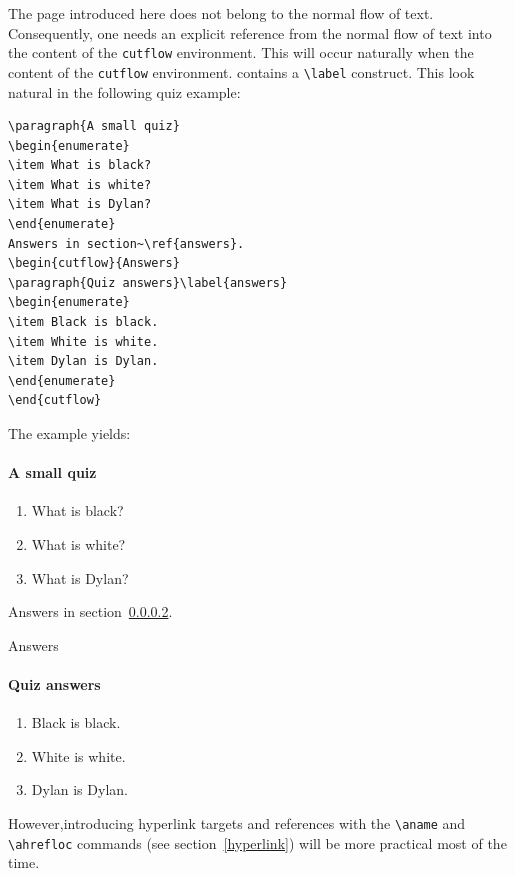 The \html{} page introduced here does not belong to the normal flow of
text.
Consequently, one needs an explicit reference from the normal flow of text
into the content of the \verb+cutflow+ environment.
This will occur naturally when the content of the \verb+cutflow+ environment.
contains a \verb+\label+ construct.
This look natural in the following quiz example:
\begin{verbatim}
\paragraph{A small quiz}
\begin{enumerate}
\item What is black?
\item What is white?
\item What is Dylan?
\end{enumerate}
Answers in section~\ref{answers}.
\begin{cutflow}{Answers}
\paragraph{Quiz answers}\label{answers}
\begin{enumerate}
\item Black is black.
\item White is white.
\item Dylan is Dylan.
\end{enumerate}
\end{cutflow}
\end{verbatim}
\ifhevea The example yields:
\paragraph{A small quiz}
\begin{enumerate}
\item What is black?
\item What is white?
\item What is Dylan?
\end{enumerate}
Answers in section~\ref{answers}.
\begin{cutflow}{Answers}
\paragraph{Quiz answers}\label{answers}
\begin{enumerate}
\item Black is black.
\item White is white.
\item Dylan is Dylan.
\end{enumerate}
\end{cutflow}
\fi
{}
However,introducing \html{} hyperlink targets and
references with the \verb+\aname+ and \verb+\ahrefloc+ commands
(see section~\ref{hyperlink})
will be more practical most of the time.

